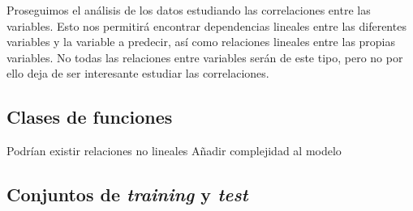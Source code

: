 \documentclass[a4paper, 20pt]{article}
\begin{document}
Proseguimos el análisis de los datos estudiando las correlaciones entre las variables. Esto nos permitirá encontrar dependencias lineales entre las diferentes variables y la variable a predecir, así como relaciones lineales entre las propias variables. No todas las relaciones entre variables serán de este tipo, pero no por ello deja de ser interesante estudiar las correlaciones.

\subsection{Clases de funciones}
Podrían existir relaciones no lineales
Añadir complejidad al modelo 
\subsection{Conjuntos de \textit{training} y \textit{test}}
\end{document}
